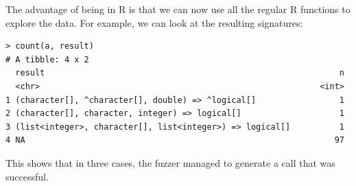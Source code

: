 \documentclass[sigplan,nonacm,anonymous,review]{acmart}
\begin{document}
The advantage of being in R is that we can now use all the regular R functions to explore the data.
For example, we can look at the resulting signatures:

\begin{lstlisting}
> count(a, result)
# A tibble: 4 x 2
  result                                                            n
  <chr>                                                         <int>
1 (character[], ^character[], double) => ^logical[]                 1
2 (character[], character, integer) => logical[]                    1
3 (list<integer>, character[], list<integer>) => logical[]          1
4 NA                                                               97
\end{lstlisting}

This shows that in three cases, the fuzzer managed to generate a call that was successful.
\end{document}

